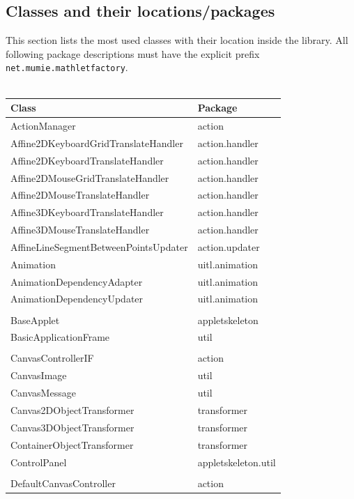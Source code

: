 \documentclass[a4paper,12pt]{book}
\begin{document}
\begin{appendix}
  \clearpage
  
  \section{Classes and their locations/packages}
  This section lists the most used classes with their location inside the library.
  All following package descriptions must have the explicit prefix  
  \verb|net.mumie.mathletfactory|.\\\\
  {\small\ttfamily
  \begin{longtable}{l | l}
    \rmfamily Class & \rmfamily Package\\ \hline\hline
    \endhead
    ActionManager & action\\
    Affine2DKeyboardGridTranslateHandler & action.handler\\
    Affine2DKeyboardTranslateHandler & action.handler\\
    Affine2DMouseGridTranslateHandler & action.handler\\
    Affine2DMouseTranslateHandler & action.handler\\
    Affine3DKeyboardTranslateHandler & action.handler\\
    Affine3DMouseTranslateHandler & action.handler\\
    AffineLineSegmentBetweenPointsUpdater & action.updater\\
    Animation & uitl.animation\\
    AnimationDependencyAdapter & uitl.animation\\
    AnimationDependencyUpdater & uitl.animation\\
    \\
    BaseApplet & appletskeleton\\
    BasicApplicationFrame & util\\
    \\
    CanvasControllerIF & action\\
    CanvasImage & util\\
    CanvasMessage & util\\
    Canvas2DObjectTransformer & transformer\\
    Canvas3DObjectTransformer & transformer\\
    ContainerObjectTransformer & transformer\\
    ControlPanel & appletskeleton.util\\
    \\
    DefaultCanvasController & action\\

\end{longtable}}
\end{appendix}
\end{document}
